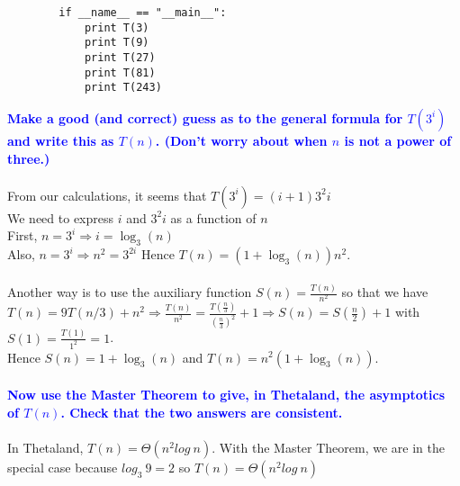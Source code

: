 \documentclass[11pt]{article}
\begin{document}
\begin{enumerate}
\begin{verbatim}
        if __name__ == "__main__":
            print T(3)
            print T(9)
            print T(27)
            print T(81)
            print T(243)
        \end{verbatim}
    \textbf{\textcolor{blue}{Make a good (and correct) guess as to the general formula for $T(3^i)$ and
    write this as $T(n)$.  (Don't worry about when $n$ is not a power
    of three.)}}
        \\\\ From our calculations, it seems that $T(3^i) = (i + 1)3^2i$
        \\ We need to express $i$ and $3^2i$ as a function of $n$
        \\ First, $n = 3^i \Rightarrow i = \log_3(n)$
        \\ Also, $n = 3^i \Rightarrow n^2 = 3^{2i}$
        Hence $T(n) = (1 + \log_3(n))n^2$.
        \\\\ Another way is to use the auxiliary function $S(n) = \frac{T(n)}{n^2}$ so that we have \\
        $T(n)=9T(n/3) + n^2 \Rightarrow \frac{T(n)}{n^2} = \frac{T(\frac{n}{3})}{(\frac{n}{3})^2} + 1 \Rightarrow 
        S(n) = S(\frac{n}{2}) + 1$ with $S(1)=\frac{T(1)}{1^2}=1$.
        \\ Hence $S(n)=1+\log_3(n)$ and $T(n)=n^2(1+\log_3(n))$.
        \\\\
    \textbf{\textcolor{blue}{Now use the Master Theorem to give, in Thetaland, the asymptotics of $T(n)$.
    Check that the two answers are consistent.}}
        \\\\ In Thetaland, $T(n) = \Theta(n^2 log\ n)$. With the Master Theorem, we are in the special case because $log_3\ 9 = 2$ so $T(n) = \Theta(n^2 log\ n)$ \\


\end{enumerate}
\end{document}
